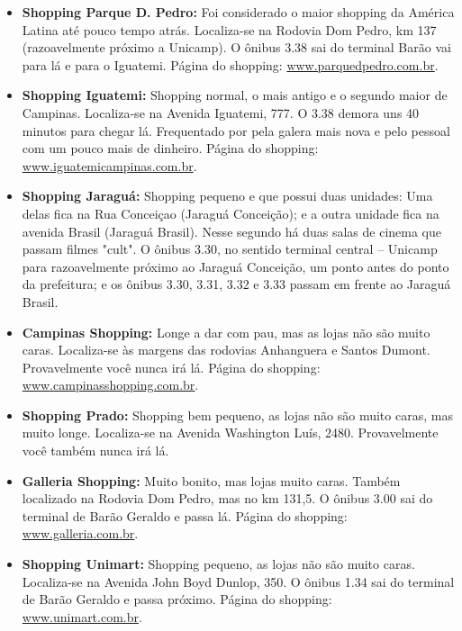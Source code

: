 \begin{itemize}

\item  \textbf{Shopping Parque D. Pedro:} Foi considerado o maior shopping da
    América Latina até pouco tempo atrás. Localiza-se na Rodovia Dom Pedro, km
    137 (razoavelmente próximo a Unicamp). O ônibus 3.38 sai do terminal Barão
    vai para lá e para o Iguatemi. Página do shopping:
    \url{www.parquedpedro.com.br}.

\item  \textbf{Shopping Iguatemi:} Shopping normal, o mais antigo e o segundo
    maior de Campinas. Localiza-se na Avenida Iguatemi, 777. O 3.38 demora uns
    40 minutos para chegar lá. Frequentado por pela galera mais nova e pelo
    pessoal com um pouco mais de dinheiro. Página do shopping:
    \url{www.iguatemicampinas.com.br}.

\item  \textbf{Shopping Jaraguá:} Shopping pequeno e que possui duas unidades:
    Uma delas fica na Rua Conceiçao (Jaraguá Conceição); e a outra unidade fica
    na avenida Brasil (Jaraguá Brasil). Nesse segundo há duas salas de cinema
    que passam filmes "cult". O ônibus 3.30, no sentido terminal central --
    Unicamp para razoavelmente próximo ao Jaraguá Conceição, um ponto antes do
    ponto da prefeitura; e os ônibus 3.30, 3.31, 3.32 e 3.33 passam em frente ao
    Jaraguá Brasil.

\item  \textbf{Campinas Shopping:} Longe a dar com pau, mas as lojas não são
    muito caras. Localiza-se às margens das rodovias Anhanguera e Santos Dumont.
    Provavelmente você nunca irá lá. Página do shopping:
    \url{www.campinasshopping.com.br}.

\item  \textbf{Shopping Prado:} Shopping bem pequeno, as lojas não são muito
    caras, mas muito longe. Localiza-se na Avenida Washington Luís, 2480.
    Provavelmente você também nunca irá lá.

\item  \textbf{Galleria Shopping:} Muito bonito, mas lojas muito caras. Também
    localizado na Rodovia Dom Pedro, mas no km 131,5. O ônibus 3.00 sai do
    terminal de Barão Geraldo e passa lá. Página do shopping:
    \url{www.galleria.com.br}.

\item  \textbf{Shopping Unimart:} Shopping pequeno, as lojas não são muito
    caras. Localiza-se na Avenida John Boyd Dunlop, 350. O ônibus 1.34 sai do
    terminal de Barão Geraldo e passa próximo. Página do shopping:
    \url{www.unimart.com.br}.

\end{itemize}
